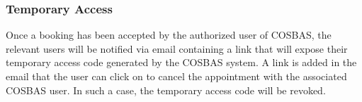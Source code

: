 	\subsubsection{Temporary Access}
	Once a booking has been accepted by the authorized user of COSBAS, the relevant users will be notified via email containing a link that will expose their temporary access code generated by the COSBAS system. A link is added in the email that the user can click on to cancel the appointment with the associated COSBAS user. In such a case, the temporary access code will be revoked.